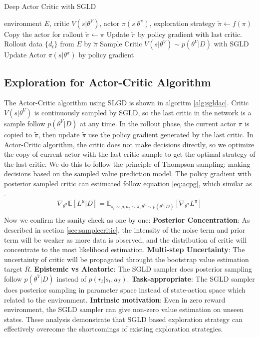 \begin{algorithm}[htbp]
   \caption{Deep Actor Critic with SGLD}
   \label{alg:sgldac}
\begin{algorithmic}
    environment $E$, critic $V(s|\theta^V)$, actor $\pi(s|\theta^\pi)$, exploration strategy $\tilde\pi \leftarrow f(\pi)$
   \STATE Copy the actor for rollout $\tilde \pi\leftarrow \pi$
   \STATE Update $\tilde\pi$ by policy gradient with last critic.
   \ENDFOR
   \STATE Rollout data $\{d_t\}$ from $E$ by $\tilde\pi$
   \STATE Sample Critic $V(s|\theta^V) \sim p(\theta^V|D)$ with SGLD
   \STATE Update Actor $\pi(s|\theta^\pi)$ by policy gradient 
   \ENDFOR
   \ENDFOR
\end{algorithmic}
\end{algorithm}
\subsection{Exploration for Actor-Critic Algorithm}
The Actor-Critic algorithm using SLGD is shown in algoritm \ref{alg:sgldac}. Critic $V(s|\theta^V)$ is continuously sampled by SGLD, so the last critic in the network is a sample follow $p(\theta^V|D)$ at any time. In the rollout phase, the current actor $\pi$ is copied to $\tilde\pi$, then update $\tilde\pi$ use the policy gradient generated by the last critic. In Actor-Critic algorithm, the critic does not make decisions directly, so we optimize the copy of current actor with the last critic sample to get the optimal strategy of the last critic. We do this to follow the principle of Thompson sampling: making decisions based on the sampled value prediction model. The policy gradient with posterior sampled critic can estimated follow equation \ref{eq:acpg}, which similar as \cite{dropoutInference}.
\begin{equation}
   \label{eq:acpg} 
   \begin{aligned}
   \nabla_{\theta^\pi}\mathbb{E}[L^\mu|D] = \mathbb{E}_{s_t\sim\rho,a_t\sim\pi,\theta^V\sim p(\theta^V|D)}[\nabla_{\theta^\pi}L^\pi]\\
   \end{aligned}
\end{equation}
Now we confirm the sanity check as \cite{osband2018randomized} one by one: \textbf{Posterior Concentration}: As described in section \ref{sec:samplecritic}, the intensity of the noise term and prior term will be weaker as more data is observed, and the distribution of critic will concentrate to the most likelihood estimation. \textbf{Multi-step Uncertainty}: The uncertainty of critic will be propagated throught the bootstrap value estimation target $R$. \textbf{Epistemic vs Aleatoric}: The SGLD sampler does posterior sampling follow $p(\theta^V|D)$ instead of $p(r_t|s_t,a_T)$. \textbf{Task-appropriate}: The SGLD sampler does posterior sampling in parameter space instead of state-action space which related to the environment. \textbf{Intrinsic motivation}: Even in zero reward environment, the SGLD sampler can give non-zero value estimation on unseen states. These analysis demonstrate that SGLD based exploration strategy can effectively overcome the shortcomings of existing exploration strategies.